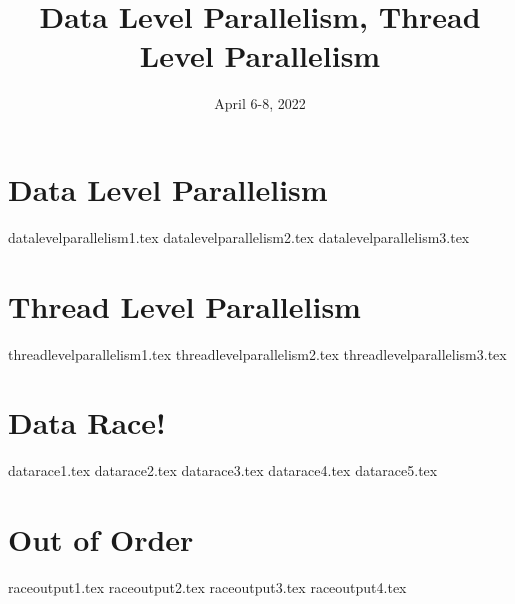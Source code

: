 \documentclass[11pt]{exam}
\title{Data Level Parallelism, Thread Level Parallelism}
\date{April 6-8, 2022}
\begin{document}
\maketitle

\section{Data Level Parallelism}
\begin{questions}
{datalevelparallelism1.tex}
{datalevelparallelism2.tex}
{datalevelparallelism3.tex}
\end{questions}

\section{Thread Level Parallelism}
\begin{questions}
{threadlevelparallelism1.tex}
{threadlevelparallelism2.tex}
{threadlevelparallelism3.tex}
\end{questions}
\newpage

\section{Data Race!}
\begin{questions}
{datarace1.tex}
{datarace2.tex}
{datarace3.tex}
{datarace4.tex}
{datarace5.tex}
\end{questions}
\newpage

\section{Out of Order}
\begin{questions}
{raceoutput1.tex}
{raceoutput2.tex}
{raceoutput3.tex}
{raceoutput4.tex}
\end{questions}
\newpage
\end{document}
